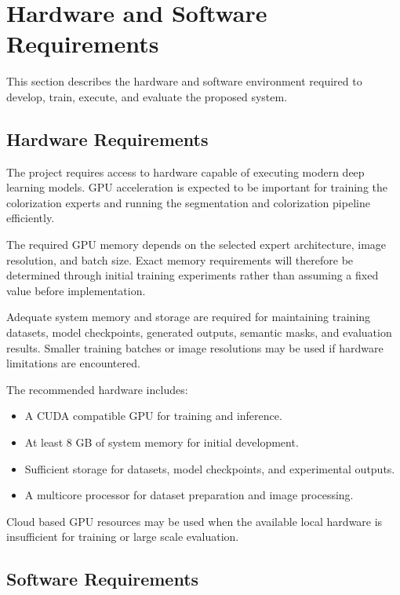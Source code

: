 \documentclass{FastFyp}
\begin{document}
\section{Hardware and Software Requirements}

This section describes the hardware and software environment required to develop, train, execute, and evaluate the proposed system.

\subsection{Hardware Requirements}

The project requires access to hardware capable of executing modern deep learning models. GPU acceleration is expected to be important for training the colorization experts and running the segmentation and colorization pipeline efficiently.

The required GPU memory depends on the selected expert architecture, image resolution, and batch size. Exact memory requirements will therefore be determined through initial training experiments rather than assuming a fixed value before implementation.

Adequate system memory and storage are required for maintaining training datasets, model checkpoints, generated outputs, semantic masks, and evaluation results. Smaller training batches or image resolutions may be used if hardware limitations are encountered.

The recommended hardware includes:

\begin{itemize}
    \item A CUDA compatible GPU for training and inference.
    
    \item At least 8 GB of system memory for initial development.
    
    \item Sufficient storage for datasets, model checkpoints, and experimental outputs.
    
    \item A multicore processor for dataset preparation and image processing.
\end{itemize}

Cloud based GPU resources may be used when the available local hardware is insufficient for training or large scale evaluation.

\subsection{Software Requirements}
\end{document}
